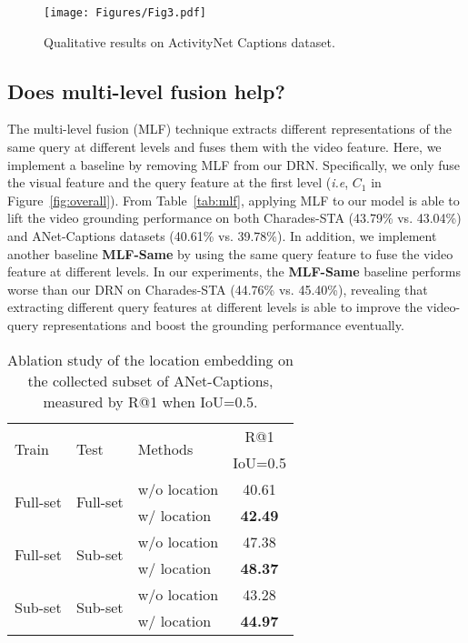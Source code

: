 \documentclass[10pt,twocolumn,letterpaper]{article}
\def\ie{\emph{i.e}\onedot} \def\Ie{\emph{I.e}\onedot}
\begin{document}
	
	\begin{figure*}[!t]
\texttt{[image: Figures/Fig3.pdf]}
		\caption{Qualitative results on ActivityNet Captions dataset.}
		\label{fig:visualization}
	\end{figure*}
	
	\subsection{Does multi-level fusion help?}
	
	The multi-level fusion (MLF) technique extracts different representations of the same query at different levels and fuses them with the video feature. Here, we implement a baseline by removing MLF from our DRN. Specifically, we only fuse the visual feature and the query feature at the first level (\ie, $C_1$ in Figure~\ref{fig:overall}). From Table~\ref{tab:mlf}, applying MLF to our model is able to lift the video grounding performance on both Charades-STA (43.79\% vs. 43.04\%) and ANet-Captions datasets (40.61\% vs. 39.78\%). In addition, we implement another baseline \textbf{MLF-Same} by using the same query feature to fuse the video feature at different levels. In our experiments, the \textbf{MLF-Same} baseline performs worse than our DRN on Charades-STA (44.76\% vs. 45.40\%), revealing that extracting different query features at different levels is able to improve the video-query representations and boost the grounding performance eventually. 
	
\begin{table}[!t]
	\centering
	\caption{Ablation study of the location embedding on the collected subset of ANet-Captions, measured by R@1 when IoU=0.5.}
	\begin{tabular}{l|l|l|c}
		\hline
		\multirow{2}{*}{Train} & \multirow{2}{*}{Test} & \multirow{2}{*}{Methods} & R@1         \\
		&      &                    & IoU=0.5 \\ \hline
		\multirow{2}{*}{Full-set}  & \multirow{2}{*}{Full-set}   &    w/o location      & 40.61   \\  
		&  &  w/ location         &  \textbf{42.49}   \\ \hline
		\multirow{2}{*}{Full-set}  & \multirow{2}{*}{Sub-set}   &    w/o location      & 47.38   \\ 
		&  &  w/ location         &  \textbf{48.37}   \\
		\hline 
		\multirow{2}{*}{Sub-set}  & \multirow{2}{*}{Sub-set}   &   w/o location                   & 43.28       \\
		&   & w/ location                 & \textbf{44.97 }     \\
		\hline
	\end{tabular}\label{tab:temporal}
			\vspace{-0.1in}
\end{table}
	
\end{document}
